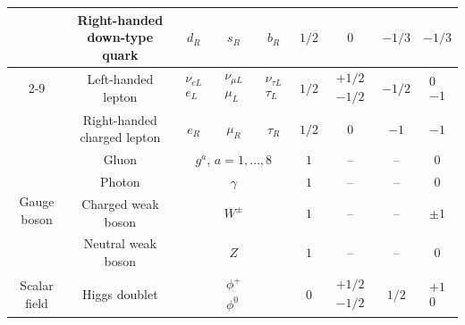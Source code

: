 \begin{table}[htbp]
{\begin{tabular}{ccccccccc}
        & Right-handed down-type quark
        & $d_{R}$
        & $s_{R}$
        & $b_{R}$
        & $1/2$
        & $0$
        & $-1/3$
        & $-1/3$ \\

        \cmidrule(lr){2-9}

        & Left-handed lepton
        & $\begin{array}{c} \nu_{eL} \\ e_{L} \end{array}$
        & $\begin{array}{c} \nu_{\mu L} \\ \mu_{L} \end{array}$
        & $\begin{array}{c} \nu_{\tau L} \\ \tau_{L} \end{array}$
        & $1/2$
        & $\begin{array}{c} +1/2 \\ -1/2 \end{array}$
        & $-1/2$
        & $\begin{array}{c} 0 \\ -1 \end{array}$ \\

        & Right-handed charged lepton
        & $e_{R}$
        & $\mu_{R}$
        & $\tau_{R}$
        & $1/2$
        & $0$
        & $-1$
        & $-1$ \\

        \midrule

        \multirow{4}{*}{Gauge boson}
        & Gluon
        & \multicolumn{3}{c}{$g^{a}$, $a=1,\ldots,8$}
        & $1$
        & --
        & --
        & $0$ \\

        & Photon
        & \multicolumn{3}{c}{$\gamma$}
        & $1$
        & --
        & --
        & $0$ \\

        & Charged weak boson
        & \multicolumn{3}{c}{$W^{\pm}$}
        & $1$
        & --
        & --
        & $\pm1$ \\

        & Neutral weak boson
        & \multicolumn{3}{c}{$Z$}
        & $1$
        & --
        & --
        & $0$ \\

        \midrule

        Scalar field
        & Higgs doublet
        & \multicolumn{3}{c}{
            $\begin{array}{c}
                \phi^{+} \\
                \phi^{0}
            \end{array}$
        }
        & $0$
        & $\begin{array}{c} +1/2 \\ -1/2 \end{array}$
        & $1/2$
        & $\begin{array}{c} +1 \\ 0 \end{array}$ \\


\end{tabular}}
\end{table}

